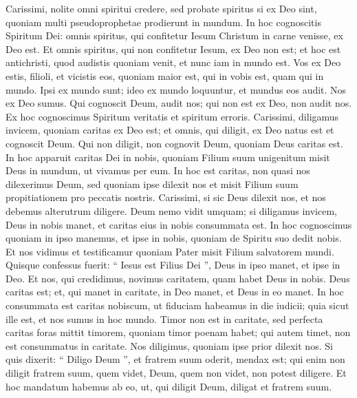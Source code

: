 \begin{biblechapter}
\begin{biblechapter}
\begin{biblechapter}
\begin{biblechapter}
\verse Carissimi, nolite omni spiritui credere, sed probate spiritus si ex Deo sint, quoniam multi pseudoprophetae prodierunt in mundum. 
\verse In hoc cognoscitis Spiritum Dei: omnis spiritus, qui confitetur Iesum Christum in carne venisse, ex Deo est. 
 \verse Et omnis spiritus, qui non confitetur Iesum, ex Deo non est; et hoc est antichristi, quod audistis quoniam venit, et nunc iam in mundo est. 
\verse Vos ex Deo estis, filioli, et vicistis eos, quoniam maior est, qui in vobis est, quam qui in mundo. 
\verse Ipsi ex mundo sunt; ideo ex mundo loquuntur, et mundus eos audit. 
\verse Nos ex Deo sumus. Qui cognoscit Deum, audit nos; qui non est ex Deo, non audit nos. Ex hoc cognoscimus Spiritum veritatis et spiritum erroris.
 \verse Carissimi, diligamus invicem, quoniam caritas ex Deo est; et omnis, qui diligit, ex Deo natus est et cognoscit Deum. 
\verse Qui non diligit, non cognovit Deum, quoniam Deus caritas est. 
\verse In hoc apparuit caritas Dei in nobis, quoniam Filium suum unigenitum misit Deus in mundum, ut vivamus per eum. 
\verse In hoc est caritas, non quasi nos dilexerimus Deum, sed quoniam ipse dilexit nos et misit Filium suum propitiationem pro peccatis nostris.
 \verse Carissimi, si sic Deus dilexit nos, et nos debemus alterutrum diligere. 
 \verse Deum nemo vidit umquam; si diligamus invicem, Deus in nobis manet, et caritas eius in nobis consummata est. 
\verse In hoc cognoscimus quoniam in ipso manemus, et ipse in nobis, quoniam de Spiritu suo dedit nobis. 
\verse Et nos vidimus et testificamur quoniam Pater misit Filium salvatorem mundi. 
\verse Quisque confessus fuerit: “ Iesus est Filius Dei ”, Deus in ipso manet, et ipse in Deo. 
 \verse Et nos, qui credidimus, novimus caritatem, quam habet Deus in nobis. Deus caritas est; et, qui manet in caritate, in Deo manet, et Deus in eo manet.
 \verse In hoc consummata est caritas nobiscum, ut fiduciam habeamus in die iudicii; quia sicut ille est, et nos sumus in hoc mundo. 
\verse Timor non est in caritate, sed perfecta caritas foras mittit timorem, quoniam timor poenam habet; qui autem timet, non est consummatus in caritate.
 \verse Nos diligimus, quoniam ipse prior dilexit nos. 
\verse Si quis dixerit: “ Diligo Deum ”, et fratrem suum oderit, mendax est; qui enim non diligit fratrem suum, quem videt, Deum, quem non videt, non potest diligere. 
\verse Et hoc mandatum habemus ab eo, ut, qui diligit Deum, diligat et fratrem suum.
 

\end{biblechapter}
\end{biblechapter}
\end{biblechapter}
\end{biblechapter}

